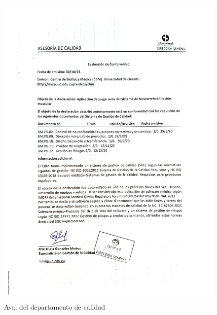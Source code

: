 \begin{annexes}
    \begin{figure}[ht]
        \centering
        \includegraphics[width=\textwidth, height=0.98\textheight]{images/annexes/aval - calidad del softw.jpg}
        \caption{Aval del departamento de calidad}
        \label{annex: qualitydepartment}
    \end{figure}
\end{annexes}